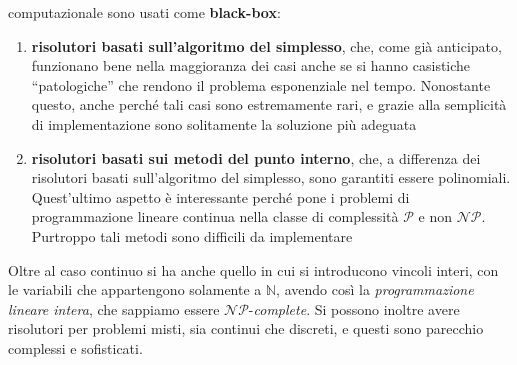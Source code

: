 \documentclass[a4paper,12pt, oneside]{book}
\begin{document}
computazionale sono usati come \textbf{black-box}:
\begin{enumerate}
  \item \textbf{risolutori basati sull'algoritmo del simplesso}, che, come già
  anticipato, funzionano bene nella maggioranza dei casi anche se si hanno
  casistiche ``patologiche'' che rendono il problema esponenziale nel
  tempo. Nonostante questo, anche perché tali casi sono estremamente rari, e
  grazie alla semplicità di implementazione sono solitamente la soluzione più
  adeguata 
  \item \textbf{risolutori basati sui metodi del punto interno}, che, a
  differenza dei risolutori basati sull'algoritmo del simplesso, sono garantiti
  essere polinomiali. Quest'ultimo aspetto è interessante perché pone i problemi
  di programmazione lineare continua nella classe di complessità $\mathcal{P}$ e
  non $\mathcal{NP}$. Purtroppo tali metodi sono difficili da implementare
\end{enumerate}
Oltre al caso continuo si ha anche quello in cui si introducono vincoli interi,
con le variabili che appartengono solamente a $\mathbb{N}$, avendo così la
\textit{programmazione lineare intera}, che sappiamo essere
$\mathcal{NP}$-\textit{complete}. Si possono inoltre avere risolutori per
problemi misti, sia continui che discreti, e questi sono parecchio complessi e
sofisticati.
\end{document}
